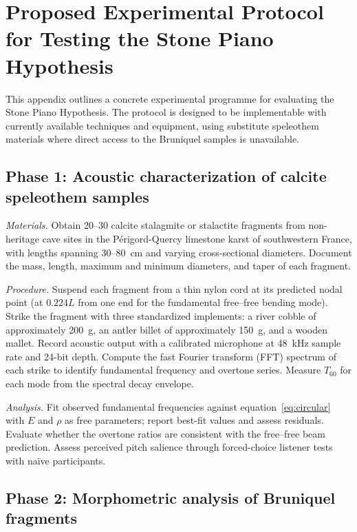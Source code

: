 \documentclass[12pt]{article}
\begin{document}
\section{Proposed Experimental Protocol for Testing the Stone Piano Hypothesis}

This appendix outlines a concrete experimental programme for evaluating the Stone Piano Hypothesis. The protocol is designed to be implementable with currently available techniques and equipment, using substitute speleothem materials where direct access to the Bruniquel samples is unavailable.

\subsection*{Phase 1: Acoustic characterization of calcite speleothem samples}

\textit{Materials.} Obtain 20--30 calcite stalagmite or stalactite fragments from non-heritage cave sites in the Périgord-Quercy limestone karst of southwestern France, with lengths spanning 30--80~cm and varying cross-sectional diameters. Document the mass, length, maximum and minimum diameters, and taper of each fragment.

\textit{Procedure.} Suspend each fragment from a thin nylon cord at its predicted nodal point (at $0.224L$ from one end for the fundamental free--free bending mode). Strike the fragment with three standardized implements: a river cobble of approximately 200~g, an antler billet of approximately 150~g, and a wooden mallet. Record acoustic output with a calibrated microphone at 48~kHz sample rate and 24-bit depth. Compute the fast Fourier transform (FFT) spectrum of each strike to identify fundamental frequency and overtone series. Measure $T_{60}$ for each mode from the spectral decay envelope.

\textit{Analysis.} Fit observed fundamental frequencies against equation~\eqref{eq:circular} with $E$ and $\rho$ as free parameters; report best-fit values and assess residuals. Evaluate whether the overtone ratios are consistent with the free--free beam prediction. Assess perceived pitch salience through forced-choice listener tests with naïve participants.

\subsection*{Phase 2: Morphometric analysis of Bruniquel fragments}
\end{document}
